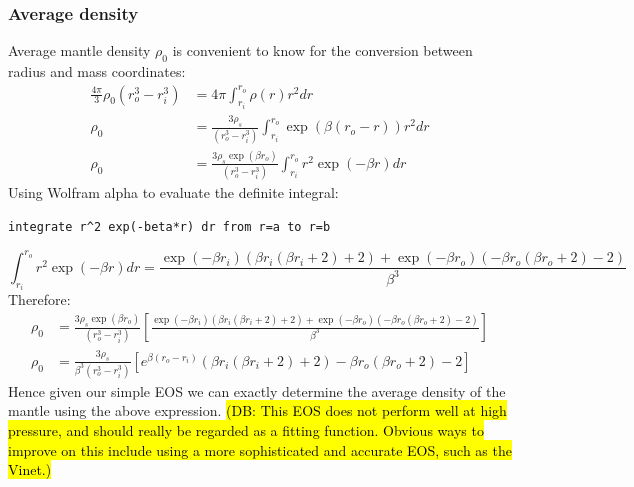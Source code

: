 \documentclass[12pt,notitlepage]{article}
\newcommand{\dbnote}[1]{\sethlcolor{bluehl}\hl{(DB: #1)}}
\begin{document}
\subsubsection{Average density}
Average mantle density $\rho_0$ is convenient to know for the conversion between radius and mass coordinates:
\begin{align}
\frac{4 \pi}{3} \rho_0 (r_o^3-r_i^3) &= 4 \pi \int_{r_i}^{r_o} \rho(r) r^2 dr\\
\rho_0 &= \frac{3 \rho_s}{(r_o^3-r_i^3)} \int_{r_i}^{r_o} \exp( \beta (r_o-r) ) r^2 dr\\
\rho_0 &= \frac{3 \rho_s \exp( \beta r_o )}{(r_o^3-r_i^3)} \int_{r_i}^{r_o} r^2 \exp( -\beta r) dr
\end{align}
Using Wolfram alpha to evaluate the definite integral:
\begin{verbatim}
integrate r^2 exp(-beta*r) dr from r=a to r=b
\end{verbatim}
\begin{equation}
\int_{r_i}^{r_o} r^2 \exp( -\beta r) dr = \frac{\exp(-\beta r_i)(\beta r_i (\beta r_i+2)+2) + \exp(-\beta r_o)(-\beta r_o (\beta r_o+2)-2)}{\beta^3}
\end{equation}
Therefore:
\begin{align}
\rho_0 &= \frac{3 \rho_s \exp( \beta r_o )}{(r_o^3-r_i^3)}
\left[
\frac{\exp(-\beta r_i)(\beta r_i (\beta r_i+2)+2) + \exp(-\beta r_o)(-\beta r_o (\beta r_o+2)-2)}{\beta^3}
\right]\\
\rho_0 &= \frac{3 \rho_s}{\beta^3 (r_o^3-r_i^3)}
\left[
e^{\beta (r_o-r_i)}(\beta r_i (\beta r_i+2)+2) -\beta r_o (\beta r_o+2)-2
\right]
\end{align}
Hence given our simple EOS we can exactly determine the average density of the mantle using the above expression.  \dbnote{This EOS does not perform well at high pressure, and should really be regarded as a fitting function.  Obvious ways to improve on this include using a more sophisticated and accurate EOS, such as the Vinet.}
\end{document}
